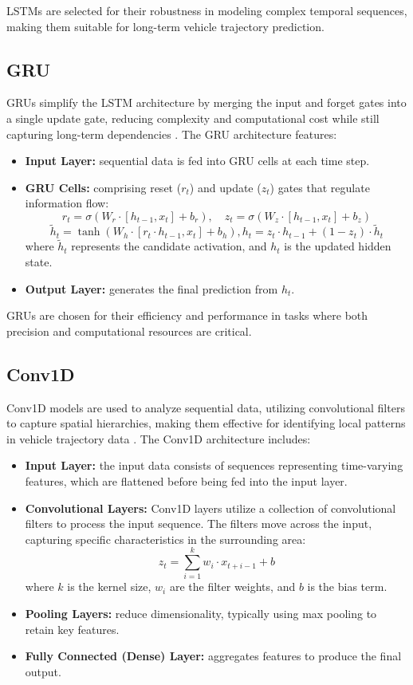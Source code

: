 \documentclass[conference]{IEEEtran}
\begin{document}
{LSTMs are selected for their robustness in modeling complex temporal sequences, making them suitable for long-term vehicle trajectory prediction.

\subsection{GRU}
GRUs simplify the LSTM architecture by merging the input and forget gates into a single update gate, reducing complexity and computational cost while still capturing long-term dependencies \cite{prep23ghojogh}. The GRU architecture features:
\begin{itemize}
    \item \textbf{Input Layer:} sequential data is fed into GRU cells at each time step.
    \item \textbf{GRU Cells:} comprising reset (\( r_t \)) and update (\( z_t \)) gates that regulate information flow:
    \[
    r_t = \sigma(W_r \cdot [h_{t-1}, x_t] + b_r),  \quad z_t = \sigma(W_z \cdot [h_{t-1}, x_t] + b_z)
    \]
    \[
    \tilde{h}_t = \tanh(W_h \cdot [r_t \cdot h_{t-1}, x_t] + b_h),  h_t = z_t \cdot h_{t-1} + (1 - z_t) \cdot \tilde{h}_t
    \]
    where \( \tilde{h}_t \) represents the candidate activation, and \( h_t \) is the updated hidden state.
    \item \textbf{Output Layer:} generates the final prediction from \( h_t \).
\end{itemize}

GRUs are chosen for their efficiency and performance in tasks where both precision and computational resources are critical.

\subsection{Conv1D}
Conv1D models are used to analyze sequential data, utilizing convolutional filters to capture spatial hierarchies, making them effective for identifying local patterns in vehicle trajectory data \cite{jymssp21kiranyaz}. The Conv1D architecture includes:
\begin{itemize}
    \item \textbf{Input Layer:} the input data consists of sequences representing time-varying features, which are flattened before being fed into the input layer.
    \item \textbf{Convolutional Layers:} Conv1D layers utilize a collection of convolutional filters to process the input sequence. The filters move across the input, capturing specific characteristics in the surrounding area:
    \[
    z_t = \sum_{i=1}^{k} w_i \cdot x_{t+i-1} + b
    \]
    where \( k \) is the kernel size, \( w_i \) are the filter weights, and \( b \) is the bias term.
    \item \textbf{Pooling Layers:} reduce dimensionality, typically using max pooling to retain key features.
    \item \textbf{Fully Connected (Dense) Layer:} aggregates features to produce the final output.
\end{itemize}

}
\end{document}
